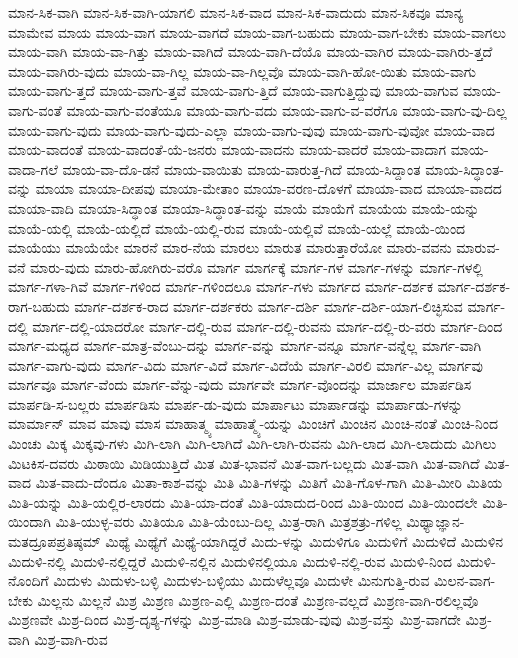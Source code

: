 {ಮಾನ-ಸಿಕ-ವಾಗಿ
ಮಾನ-ಸಿಕ-ವಾಗಿ-ಯಾಗಲಿ
ಮಾನ-ಸಿಕ-ವಾದ
ಮಾನ-ಸಿಕ-ವಾದುದು
ಮಾನ-ಸಿಕವೂ
ಮಾನ್ಯ
ಮಾಮೇವ
ಮಾಯ
ಮಾಯ-ವಾಗ
ಮಾಯ-ವಾಗದೆ
ಮಾಯ-ವಾಗ-ಬಹುದು
ಮಾಯ-ವಾಗ-ಬೇಕು
ಮಾಯ-ವಾಗಲು
ಮಾಯ-ವಾಗಿ
ಮಾಯ-ವಾ-ಗಿತ್ತು
ಮಾಯ-ವಾಗಿದೆ
ಮಾಯ-ವಾಗಿ-ದೆಯೊ
ಮಾಯ-ವಾಗಿರ
ಮಾಯ-ವಾಗಿರು-ತ್ತದೆ
ಮಾಯ-ವಾಗಿರು-ವುದು
ಮಾಯ-ವಾ-ಗಿಲ್ಲ
ಮಾಯ-ವಾ-ಗಿಲ್ಲವೊ
ಮಾಯ-ವಾಗಿ-ಹೋ-ಯಿತು
ಮಾಯ-ವಾಗು
ಮಾಯ-ವಾಗು-ತ್ತದೆ
ಮಾಯ-ವಾಗು-ತ್ತವೆ
ಮಾಯ-ವಾಗು-ತ್ತಿದೆ
ಮಾಯ-ವಾಗುತ್ತಿದ್ದುವು
ಮಾಯ-ವಾಗುವ
ಮಾಯ-ವಾಗು-ವಂತೆ
ಮಾಯ-ವಾಗು-ವಂತೆಯೂ
ಮಾಯ-ವಾಗು-ವದು
ಮಾಯ-ವಾಗು-ವ-ವರೆಗೂ
ಮಾಯ-ವಾಗು-ವು-ದಿಲ್ಲ
ಮಾಯ-ವಾಗು-ವುದು
ಮಾಯ-ವಾಗು-ವುದು-ಎಲ್ಲಾ
ಮಾಯ-ವಾಗು-ವುವು
ಮಾಯ-ವಾಗು-ವುವೋ
ಮಾಯ-ವಾದ
ಮಾಯ-ವಾದಂತೆ
ಮಾಯ-ವಾದಂತೆ-ಯೆ-ಜನರು
ಮಾಯ-ವಾದನು
ಮಾಯ-ವಾದರೆ
ಮಾಯ-ವಾದಾಗ
ಮಾಯ-ವಾದಾ-ಗಲೆ
ಮಾಯ-ವಾ-ದೊ-ಡನೆ
ಮಾಯ-ವಾಯಿತು
ಮಾಯ-ವಾರುತ್ತ-ಗಿದೆ
ಮಾಯ-ಸಿದ್ದಾಂತ
ಮಾಯ-ಸಿದ್ಧಾಂತ-ವನ್ನು
ಮಾಯಾ
ಮಾಯಾ-ದೀಪವು
ಮಾಯಾ-ಮೇತಾಂ
ಮಾಯಾ-ವರಣ-ದೊಳಗೆ
ಮಾಯಾ-ವಾದ
ಮಾಯಾ-ವಾದದ
ಮಾಯಾ-ವಾದಿ
ಮಾಯಾ-ಸಿದ್ಧಾಂತ
ಮಾಯಾ-ಸಿದ್ಧಾಂತ-ವನ್ನು
ಮಾಯೆ
ಮಾಯೆಗೆ
ಮಾಯೆಯ
ಮಾಯೆ-ಯನ್ನು
ಮಾಯೆ-ಯಲ್ಲಿ
ಮಾಯೆ-ಯಲ್ಲಿದೆ
ಮಾಯೆ-ಯಲ್ಲಿ-ರುವ
ಮಾಯೆ-ಯಲ್ಲಿವೆ
ಮಾಯೆ-ಯಲ್ಲೆ
ಮಾಯೆ-ಯಿಂದ
ಮಾಯೆಯು
ಮಾಯೆಯೇ
ಮಾರನೆ
ಮಾರ-ನೆಯ
ಮಾರಲು
ಮಾರುತ
ಮಾರುತ್ತಾರೆಯೋ
ಮಾರು-ವವನು
ಮಾರುವ-ವನೆ
ಮಾರು-ವುದು
ಮಾರು-ಹೋಗಿರು-ವರೊ
ಮಾರ್ಗ
ಮಾರ್ಗಕ್ಕೆ
ಮಾರ್ಗ-ಗಳ
ಮಾರ್ಗ-ಗಳನ್ನು
ಮಾರ್ಗ-ಗಳಲ್ಲಿ
ಮಾರ್ಗ-ಗಳಾ-ಗಿವೆ
ಮಾರ್ಗ-ಗಳಿಂದ
ಮಾರ್ಗ-ಗಳಿಂದಲೂ
ಮಾರ್ಗ-ಗಳು
ಮಾರ್ಗದ
ಮಾರ್ಗ-ದರ್ಶಕ
ಮಾರ್ಗ-ದರ್ಶಕ-ರಾಗ-ಬಹುದು
ಮಾರ್ಗ-ದರ್ಶಕ-ರಾದ
ಮಾರ್ಗ-ದರ್ಶಕರು
ಮಾರ್ಗ-ದರ್ಶಿ
ಮಾರ್ಗ-ದರ್ಶಿ-ಯಾಗ-ಲಿಚ್ಛಿಸುವ
ಮಾರ್ಗ-ದಲ್ಲಿ
ಮಾರ್ಗ-ದಲ್ಲಿ-ಯಾದರೋ
ಮಾರ್ಗ-ದಲ್ಲಿ-ರುವ
ಮಾರ್ಗ-ದಲ್ಲಿ-ರುವನು
ಮಾರ್ಗ-ದಲ್ಲಿ-ರು-ವರು
ಮಾರ್ಗ-ದಿಂದ
ಮಾರ್ಗ-ಮಧ್ಯದ
ಮಾರ್ಗ-ಮಾತ್ರ-ವೆಂಬು-ದನ್ನು
ಮಾರ್ಗ-ವನ್ನು
ಮಾರ್ಗ-ವನ್ನೂ
ಮಾರ್ಗ-ವನ್ನೆಲ್ಲ
ಮಾರ್ಗ-ವಾಗಿ
ಮಾರ್ಗ-ವಾಗು-ವುದು
ಮಾರ್ಗ-ವಿದು
ಮಾರ್ಗ-ವಿದೆ
ಮಾರ್ಗ-ವಿದೆಯೆ
ಮಾರ್ಗ-ವಿರಲಿ
ಮಾರ್ಗ-ವಿಲ್ಲ
ಮಾರ್ಗವು
ಮಾರ್ಗವೂ
ಮಾರ್ಗ-ವೆಂದು
ಮಾರ್ಗ-ವೆನ್ನು-ವುದು
ಮಾರ್ಗವೇ
ಮಾರ್ಗ-ವೊಂದನ್ನು
ಮಾರ್ಜಾಲ
ಮಾರ್ಪಡಿಸ
ಮಾರ್ಪಡಿ-ಸ-ಬಲ್ಲರು
ಮಾರ್ಪಡಿಸು
ಮಾರ್ಪ-ಡು-ವುದು
ಮಾರ್ಪಾಟು
ಮಾರ್ಪಾಡನ್ನು
ಮಾರ್ಪಾಡು-ಗಳನ್ನು
ಮಾರ್ಮಾನ್
ಮಾವ
ಮಾವು
ಮಾಸ
ಮಾಹಾತ್ಮ್ಯ
ಮಾಹಾತ್ಮ್ಯೆ-ಯನ್ನು
ಮಿಂಚಿಗೆ
ಮಿಂಚಿನ
ಮಿಂಚಿ-ನಂತೆ
ಮಿಂಚಿ-ನಿಂದ
ಮಿಂಚು
ಮಿಕ್ಕ
ಮಿಕ್ಕವು-ಗಳು
ಮಿಗಿ-ಲಾಗಿ
ಮಿಗಿ-ಲಾಗಿದೆ
ಮಿಗಿ-ಲಾಗಿ-ರುವನು
ಮಿಗಿ-ಲಾದ
ಮಿಗಿ-ಲಾದುದು
ಮಿಗಿಲು
ಮಿಟಕಿಸ-ದವರು
ಮಿಠಾಯಿ
ಮಿಡಿಯುತ್ತಿದೆ
ಮಿತ
ಮಿತ-ಭಾವನೆ
ಮಿತ-ವಾಗ-ಬಲ್ಲದು
ಮಿತ-ವಾಗಿ
ಮಿತ-ವಾಗಿದೆ
ಮಿತ-ವಾದ
ಮಿತ-ವಾದು-ದೆಂದೂ
ಮಿತಾ-ಕಾಶ-ವನ್ನು
ಮಿತಿ
ಮಿತಿ-ಗಳನ್ನು
ಮಿತಿಗೆ
ಮಿತಿ-ಗೊಳ-ಗಾಗಿ
ಮಿತಿ-ಮೀರಿ
ಮಿತಿಯ
ಮಿತಿ-ಯನ್ನು
ಮಿತಿ-ಯಲ್ಲಿರ-ಲಾರದು
ಮಿತಿ-ಯಾ-ದಂತೆ
ಮಿತಿ-ಯಾದುದ-ರಿಂದ
ಮಿತಿ-ಯಿಂದ
ಮಿತಿ-ಯಿಂದಲೇ
ಮಿತಿ-ಯಿಂದಾಗಿ
ಮಿತಿ-ಯುಳ್ಳ-ವರು
ಮಿತಿಯೂ
ಮಿತಿ-ಯೆಂಬು-ದಿಲ್ಲ
ಮಿತ್ರ-ರಾಗಿ
ಮಿತ್ರಶತ್ರು-ಗಳಿಲ್ಲ
ಮಿಥ್ಯಾಜ್ಞಾನ-ಮತದ್ರೂಪಪ್ರತಿಷ್ಠಮ್
ಮಿಥ್ಯೆ
ಮಿಥ್ಯೆಗೆ
ಮಿಥ್ಯೆ-ಯಾಗಿದ್ದರೆ
ಮಿದು-ಳನ್ನು
ಮಿದುಳಿಗೂ
ಮಿದುಳಿಗೆ
ಮಿದುಳಿದೆ
ಮಿದುಳಿನ
ಮಿದುಳಿ-ನಲ್ಲಿ
ಮಿದುಳಿ-ನಲ್ಲಿದ್ದರೆ
ಮಿದುಳಿ-ನಲ್ಲಿನ
ಮಿದುಳಿನಲ್ಲಿಯೂ
ಮಿದುಳಿ-ನಲ್ಲಿ-ರುವ
ಮಿದುಳಿ-ನಿಂದ
ಮಿದುಳಿ-ನೊಂದಿಗೆ
ಮಿದುಳು
ಮಿದುಳು-ಬಳ್ಳಿ
ಮಿದುಳು-ಬಳ್ಳಿಯು
ಮಿದುಳೆಲ್ಲವೂ
ಮಿದುಳೇ
ಮಿನುಗುತ್ತಿ-ರುವ
ಮಿಲನ-ವಾಗ-ಬೇಕು
ಮಿಲ್ಲನು
ಮಿಲ್ಲನೆ
ಮಿಶ್ರ
ಮಿಶ್ರಣ
ಮಿಶ್ರಣ-ಎಲ್ಲಿ
ಮಿಶ್ರಣ-ದಂತೆ
ಮಿಶ್ರಣ-ವಲ್ಲದೆ
ಮಿಶ್ರಣ-ವಾಗಿ-ರಲಿಲ್ಲವೊ
ಮಿಶ್ರಣವೇ
ಮಿಶ್ರ-ದಿಂದ
ಮಿಶ್ರ-ದೃಶ್ಯ-ಗಳನ್ನು
ಮಿಶ್ರ-ಮಾಡಿ
ಮಿಶ್ರ-ಮಾಡು-ವುವು
ಮಿಶ್ರ-ವಸ್ತು
ಮಿಶ್ರ-ವಾಗದೇ
ಮಿಶ್ರ-ವಾಗಿ
ಮಿಶ್ರ-ವಾಗಿ-ರುವ
}
